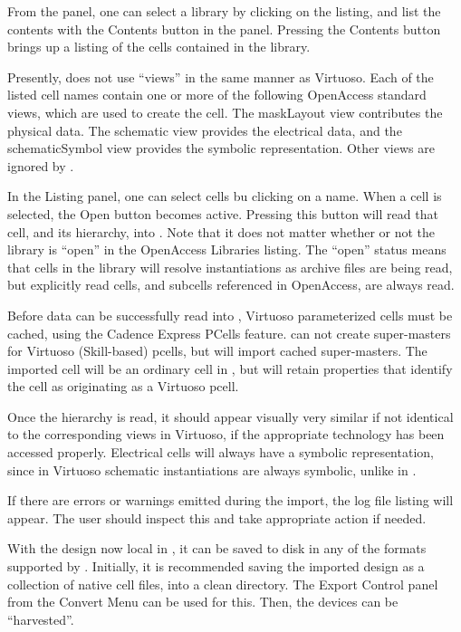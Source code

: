 From the panel, one can select a library by clicking on the listing,
and list the contents with the {\cb Contents} button in the panel. 
Pressing the {\cb Contents} button brings up a listing of the cells
contained in the library.

Presently, {\Xic} does not use ``views'' in the same manner as
Virtuoso.  Each of the listed cell names contain one or more of the
following OpenAccess standard views, which are used to create the
{\Xic} cell.  The {\vt maskLayout} view contributes the physical data. 
The {\vt schematic} view provides the electrical data, and the {\vt
schematicSymbol} view provides the {\Xic} symbolic representation. 
Other views are ignored by {\Xic}.

In the {\cb Listing} panel, one can select cells bu clicking on a
name.  When a cell is selected, the {\cb Open} button becomes active. 
Pressing this button will read that cell, and its hierarchy, into
{\Xic}.  Note that it does not matter whether or not the library is
``open'' in the {\cb OpenAccess Libraries} listing.  The ``open''
status means that cells in the library will resolve instantiations as
archive files are being read, but explicitly read cells, and subcells
referenced in OpenAccess, are always read.

Before data can be successfully read into {\Xic}, Virtuoso
parameterized cells must be cached, using the Cadence Express PCells
feature.  {\Xic} can not create super-masters for Virtuoso
(Skill-based) pcells, but will import cached super-masters.  The
imported cell will be an ordinary cell in {\Xic}, but will retain
properties that identify the cell as originating as a Virtuoso pcell.

Once the hierarchy is read, it should appear visually very similar if
not identical to the corresponding views in Virtuoso, if the
appropriate technology has been accessed properly.  Electrical cells
will always have a symbolic representation, since in Virtuoso
schematic instantiations are always symbolic, unlike in {\Xic}.

If there are errors or warnings emitted during the import, the log
file listing will appear.  The user should inspect this and take
appropriate action if needed.

With the design now local in {\Xic}, it can be saved to disk in any of
the formats supported by {\Xic}.  Initially, it is recommended saving
the imported design as a collection of native cell files, into a clean
directory.  The {\cb Export Control} panel from the {\cb Convert Menu}
can be used for this.  Then, the devices can be ``harvested''.

